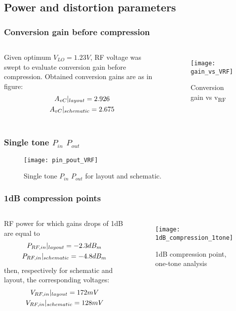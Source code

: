 \subsection{Power and distortion parameters}
\begin{frame}
\tableofcontents[currentsubsection]
\end{frame}

\begin{frame}
\frametitle{Conversion gain before compression}
\begin{columns}
Given optimum $V_{LO}=1.23V$, RF voltage was swept to evaluate conversion gain before compression. Obtained conversion gains are as in figure:
\begin{gather}
A_{vC}|_{layout}=2.926 \notag \\ 
A_{vC}|_{schematic}=2.675 \notag
\end{gather}
\begin{figure}[H]
	\centering
	\texttt{[image: gain\_vs\_VRF]}
	\caption{Conversion gain vs v\textsubscript{RF}}
	\label{fig:GainvsRF}
\end{figure}
\end{columns}
\end{frame}


\begin{frame}
\frametitle{Single tone $P_{in}$ $P_{out}$}

	\begin{figure}[H] 
		\centering
		\texttt{[image: pin\_pout\_VRF]}
		\caption{Single tone $P_{in}$ $P_{out}$ for layout and schematic.}
		\label{fig:PinPout}
	\end{figure}

\end{frame}


\begin{frame}
\frametitle{1dB compression points}
\begin{columns}
	RF power for which gains drops of 1dB are equal to 
	\begin{gather}
	P_{RF,in}|_{layout}=-2.3dB_{m} \notag \\
	P_{RF,in}|_{schematic}=-4.8dB_{m} \notag
	\end{gather}
	then, respectively for schematic and layout, the corresponding voltages:
	\begin{gather}
	V_{RF,in}|_{layout}=172mV \notag \\
	V_{RF,in}|_{schematic}=128mV \notag
	\end{gather}
	
	\begin{figure}[H] 
		\centering
		\texttt{[image: 1dB\_compression\_1tone]}
		\caption{1dB compression point, one-tone analysis}
		\label{fig:PinPout1T_1dBc}
	\end{figure}
\end{columns}
\end{frame}

